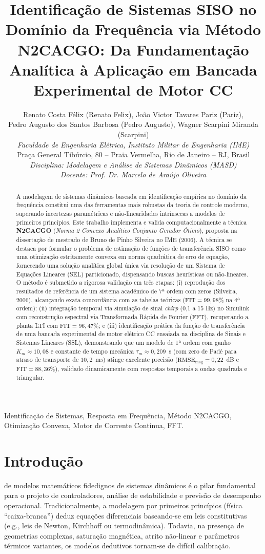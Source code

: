 \documentclass[journal,10pt,twocolumn]{IEEEtran}
\title{\LARGE \bf Identificação de Sistemas SISO no Domínio da Frequência via Método N2CACGO: Da Fundamentação Analítica à Aplicação em Bancada Experimental de Motor CC}
\author{
    Renato Costa F\'{e}lix (Renato Felix), Jo\~{a}o Victor Tavares Pariz (Pariz),\\
    Pedro Augusto dos Santos Barbosa (Pedro Augusto), Wagner Scarpini Miranda (Scarpini)\\
    \textit{Faculdade de Engenharia El\'{e}trica, Instituto Militar de Engenharia (IME)}\\
    Pra\c{c}a General Tib\'{u}rcio, 80 -- Praia Vermelha, Rio de Janeiro -- RJ, Brasil\\
    \textit{Disciplina: Modelagem e An\'{a}lise de Sistemas Din\^{a}micos (MASD)}\\
    \textit{Docente: Prof. Dr. Marcelo de Ara\'{u}jo Oliveira}
}
\begin{document}
\maketitle

\begin{abstract}
A modelagem de sistemas dinâmicos baseada em identificação empírica no domínio da frequência constitui uma das ferramentas mais robustas da teoria de controle moderno, superando incertezas paramétricas e não-linearidades intrínsecas a modelos de primeiros princípios. Este trabalho implementa e valida computacionalmente a técnica \textbf{N2CACGO} (\textit{Norma 2 Convexo Analítico Conjunto Gerador Ótimo}), proposta na dissertação de mestrado de Bruno de Pinho Silveira no IME (2006). A técnica se destaca por formular o problema de estimação de funções de transferência SISO como uma otimização estritamente convexa em norma quadrática de erro de equação, fornecendo uma solução analítica global única via resolução de um Sistema de Equações Lineares (SEL) particionado, dispensando buscas heurísticas ou não-lineares. O método é submetido a rigorosa validação em três etapas: (i) reprodução dos resultados de referência de um sistema acadêmico de 7ª ordem com zeros (Silveira, 2006), alcançando exata concordância com as tabelas teóricas ($\text{FIT} = 99,98\%$ na 4ª ordem); (ii) integração temporal via simulação de sinal \textit{chirp} (0,1 a 15 Hz) no Simulink com reconstrução espectral via Transformada Rápida de Fourier (FFT), recuperando a planta LTI com $\text{FIT} = 96,47\%$; e (iii) identificação prática da função de transferência de uma bancada experimental de motor elétrico CC ensaiada na disciplina de Sinais e Sistemas Lineares (SSL), demonstrando que um modelo de 1ª ordem com ganho $K_m \approx 10,08$ e constante de tempo mecânica $\tau_m \approx 0,209$~s (com zero de Padé para atraso de transporte de $10,2$~ms) atinge excelente precisão ($\text{RMSE}_{\text{mag}} = 0,22$~dB e $\text{FIT} = 88,36\%$), validado dinamicamente com respostas temporais a ondas quadrada e triangular.
\end{abstract}

\begin{IEEEkeywords}
Identificação de Sistemas, Resposta em Frequência, Método N2CACGO, Otimização Convexa, Motor de Corrente Contínua, FFT.
\end{IEEEkeywords}

\section{Introdução}
 de modelos matemáticos fidedignos de sistemas dinâmicos é o pilar fundamental para o projeto de controladores, análise de estabilidade e previsão de desempenho operacional. Tradicionalmente, a modelagem por primeiros princípios (física ``caixa-branca'') deduz equações diferenciais baseando-se em leis constitutivas (e.g., leis de Newton, Kirchhoff ou termodinâmica). Todavia, na presença de geometrias complexas, saturação magnética, atrito não-linear e parâmetros térmicos variantes, os modelos dedutivos tornam-se de difícil calibração.
\end{document}

